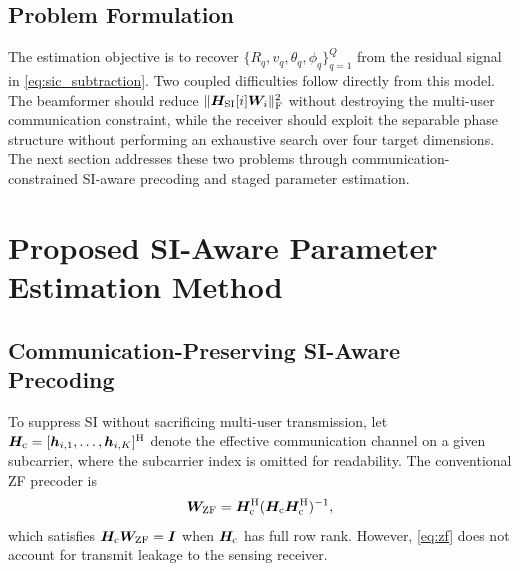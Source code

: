 \documentclass[conference]{IEEEtran}
\begin{document}
\subsection{Problem Formulation}
The estimation objective is to recover $\{R_q,v_q,\theta_q,\phi_q\}_{q=1}^{Q}$ from the residual signal in \eqref{eq:sic_subtraction}. Two coupled difficulties follow directly from this model. The beamformer should reduce $\|\bm{H}_{\rm SI}[i]\bm{W}_i\|_{\rm F}^{2}$ without destroying the multi-user communication constraint, while the receiver should exploit the separable phase structure without performing an exhaustive search over four target dimensions. The next section addresses these two problems through communication-constrained SI-aware precoding and staged parameter estimation.

\section{Proposed SI-Aware Parameter Estimation Method}\label{sec:framework}
\subsection{Communication-Preserving SI-Aware Precoding}
To suppress SI without sacrificing multi-user transmission, let $\bm{H}_{\rm c}=[\bm{h}_{i,1},\ldots,\bm{h}_{i,K}]^{\rm H}$ denote the effective communication channel on a given subcarrier, where the subcarrier index is omitted for readability. The conventional ZF precoder is
\begin{align}
    \bm{W}_{\rm ZF}=\bm{H}_{\rm c}^{\rm H}(\bm{H}_{\rm c}\bm{H}_{\rm c}^{\rm H})^{-1},
    \label{eq:zf}
\end{align}
which satisfies $\bm{H}_{\rm c}\bm{W}_{\rm ZF}=\bm{I}$ when $\bm{H}_{\rm c}$ has full row rank. However, \eqref{eq:zf} does not account for transmit leakage to the sensing receiver.
\end{document}
